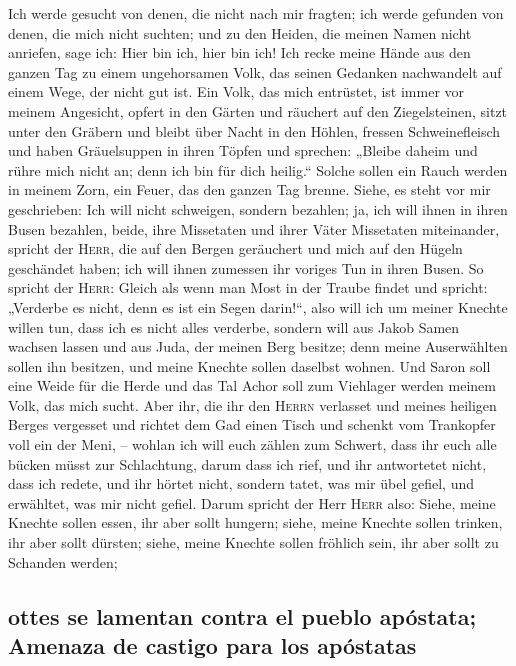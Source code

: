  Ich werde gesucht von denen, die nicht nach mir fragten;
ich werde gefunden von denen, die mich nicht suchten; und zu den Heiden,
die meinen Namen nicht anriefen, sage ich: Hier bin ich, hier bin ich!
 Ich recke meine Hände aus den ganzen Tag zu einem
ungehorsamen Volk, das seinen Gedanken nachwandelt auf einem Wege, der
nicht gut ist.  Ein Volk, das mich entrüstet, ist immer
vor meinem Angesicht, opfert in den Gärten und räuchert auf den
Ziegelsteinen,  sitzt unter den Gräbern und bleibt über
Nacht in den Höhlen, fressen Schweinefleisch und haben Gräuelsuppen in
ihren Töpfen  und sprechen: „Bleibe daheim und rühre mich
nicht an; denn ich bin für dich heilig.`` Solche sollen ein Rauch werden
in meinem Zorn, ein Feuer, das den ganzen Tag brenne. 
Siehe, es steht vor mir geschrieben: Ich will nicht schweigen, sondern
bezahlen; ja, ich will ihnen in ihren Busen bezahlen, 
beide, ihre Missetaten und ihrer Väter Missetaten miteinander, spricht
der \textsc{Herr}, die auf den Bergen geräuchert und mich auf den Hügeln
geschändet haben; ich will ihnen zumessen ihr voriges Tun in ihren
Busen.  So spricht der \textsc{Herr}: Gleich als wenn man
Most in der Traube findet und spricht: „Verderbe es nicht, denn es ist
ein Segen darin!{}``, also will ich um meiner Knechte willen tun, dass
ich es nicht alles verderbe,  sondern will aus Jakob Samen
wachsen lassen und aus Juda, der meinen Berg besitze; denn meine
Auserwählten sollen ihn besitzen, und meine Knechte sollen daselbst
wohnen.  Und Saron soll eine Weide für die Herde und das
Tal Achor soll zum Viehlager werden meinem Volk, das mich sucht.
 Aber ihr, die ihr den \textsc{Herrn} verlasset und
meines heiligen Berges vergesset und richtet dem Gad einen Tisch und
schenkt vom Trankopfer voll ein der Meni, --  wohlan ich
will euch zählen zum Schwert, dass ihr euch alle bücken müsst zur
Schlachtung, darum dass ich rief, und ihr antwortetet nicht, dass ich
redete, und ihr hörtet nicht, sondern tatet, was mir übel gefiel, und
erwähltet, was mir nicht gefiel.  Darum spricht der Herr
\textsc{Herr} also: Siehe, meine Knechte sollen essen, ihr aber sollt
hungern; siehe, meine Knechte sollen trinken, ihr aber sollt dürsten;
siehe, meine Knechte sollen fröhlich sein, ihr aber sollt zu Schanden
werden;

\hypertarget{ottes-se-lamentan-contra-el-pueblo-apuxf3stata-amenaza-de-castigo-para-los-apuxf3statas}{%
\subsection{ottes se lamentan contra el pueblo apóstata; Amenaza de
castigo para los
apóstatas}\label{ottes-se-lamentan-contra-el-pueblo-apuxf3stata-amenaza-de-castigo-para-los-apuxf3statas}}

